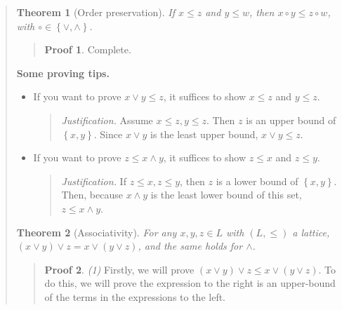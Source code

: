 \documentclass[a4paper, 12pt]{article}
\newtheorem{theorem}{Theorem}
\theoremstyle{definition}
\theoremstyle{definition}
\theoremstyle{definition}
\newtheorem{pro}{Proof}
\begin{document}
\begin{quote}
\begin{quote}
\end{quote}
\normalsize

\begin{theorem}[Order preservation]
    If $x \leq z$ and $y \leq w$, then $x \circ y \leq z \circ w$, with $\circ
    \in \left\{ \lor, \land \right\} $.
\end{theorem}

\small
\begin{quote}

\begin{pro}
    Complete.
\end{pro}

\end{quote}
\normalsize

\textbf{Some proving tips.}

\begin{itemize}
    \item If you want to prove $x \lor  y \leq z$, it suffices to show $x \leq
        z$ and $y \leq z$. 

        \begin{quote}
            \textit{Justification.} Assume $x \leq z, y \leq z$. Then $z$ is an
            upper bound of $\left\{ x, y \right\} $. Since $x \lor  y$ is the
            least upper bound, $x \lor y \leq z$.
        \end{quote}

    \item If you want to prove $z \leq x \land  y$, it suffices to show $z \leq
        x$ and $z \leq y$. 

        \begin{quote}
            \textit{Justification.} If $z \leq x, z \leq y$, then $z$ is a lower
            bound of $\left\{ x, y \right\} $. Then, because $x \land  y$ is the
            least lower bound of this set, $z \leq x \land  y$.
        \end{quote}
\end{itemize} 

\begin{theorem}[Associativity]
    For any $x, y, z \in L$ with $(L, \leq)$ a lattice, $(x \lor y) \lor z = x
    \lor (y \lor  z)$, and the same holds for $\land $.
\end{theorem}

\small
\begin{quote}

\begin{pro}
\textit{(1)} Firstly, we will prove $(x \lor  y) \lor  z \leq x
\lor  (y \lor  z)$. To do this, we will prove the expression to the right is an
upper-bound of the terms in the expressions to the left. 


\end{pro}
\end{quote}
\end{quote}
\end{document}
